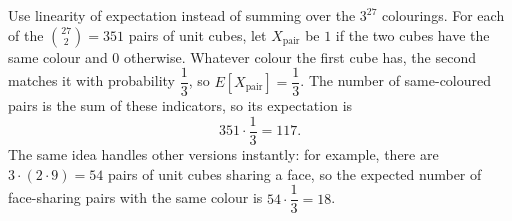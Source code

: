 Use linearity of expectation instead of summing over the $3^{27}$ colourings. For each of the $\binom{27}{2}=351$ pairs of unit cubes, let $X_{\text{pair}}$ be $1$ if the two cubes have the same colour and $0$ otherwise. Whatever colour the first cube has, the second matches it with probability $\dfrac{1}{3}$, so $E[X_{\text{pair}}]=\dfrac{1}{3}$. The number of same-coloured pairs is the sum of these indicators, so its expectation is
\[
351\cdot\dfrac{1}{3}=\boxed{117}.
\]
The same idea handles other versions instantly: for example, there are $3\cdot(2\cdot9)=54$ pairs of unit cubes sharing a face, so the expected number of face-sharing pairs with the same colour is $54\cdot\dfrac{1}{3}=18$.
